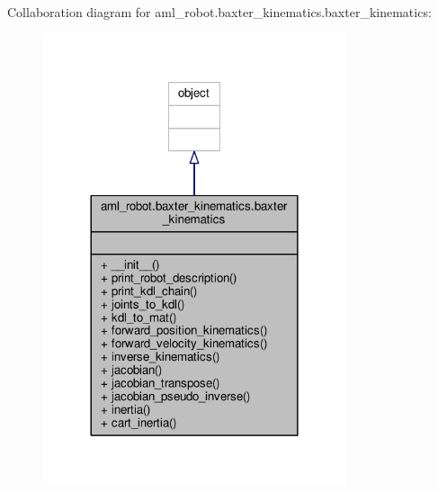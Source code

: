 Collaboration diagram for aml\-\_\-robot.\-baxter\-\_\-kinematics.\-baxter\-\_\-kinematics\-:
\nopagebreak
\begin{figure}[H]
\begin{center}
\leavevmode
\includegraphics[width=252pt]{classaml__robot_1_1baxter__kinematics_1_1baxter__kinematics__coll__graph}
\end{center}
\end{figure}
